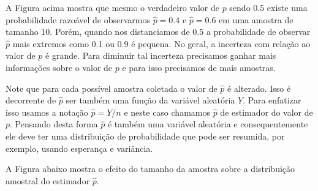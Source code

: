 \documentclass[10pt,a4paper]{book}
\begin{document}
A Figura acima mostra que mesmo o verdadeiro valor de \(p\) sendo 0.5
existe uma probabilidade razoável de observarmos \(\hat{p} = 0.4\) e
\(\hat{p} = 0.6\) em uma amostra de tamanho 10. Porém, quando nos
distanciamos de \(0.5\) a probabilidade de observar \(\hat{p}\) mais
extremos como 0.1 ou 0.9 é pequena. No geral, a incerteza com relação ao
valor de \(p\) é grande. Para diminuir tal incerteza precisamos ganhar
mais informações sobre o valor de \(p\) e para isso precisamos de mais
amostras.

Note que para cada possível amostra coletada o valor de \(\hat{p}\) é
alterado. Isso é decorrente de \(\hat{p}\) ser também uma função da
variável aleatória \(Y\). Para enfatizar isso usamos a notação
\(\hat{p} = Y/n\) e neste caso chamamos \(\hat{p}\) de estimador do
valor de \(p\). Pensando desta forma \(\hat{p}\) é também uma variável
aleatória e consequentemente ele deve ter uma distribuição de
probabilidade que pode ser resumida, por exemplo, usando esperança e
variância.

A Figura abaixo mostra o efeito do tamanho da amostra sobre a
distribuição amostral do estimador \(\hat{p}\).
\end{document}
